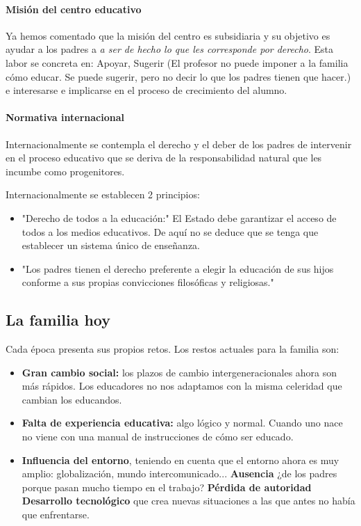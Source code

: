 \documentclass[palatino]{apuntesURJC}
\begin{document}
\paragraph{Misión del centro educativo}

Ya hemos comentado que la misión del centro es subsidiaria y su objetivo es ayudar a los padres a \textit{a ser de hecho lo que les corresponde por derecho}. Esta labor se concreta en: Apoyar, Sugerir (El profesor no puede imponer a la familia cómo educar. Se puede sugerir, pero no decir lo que los padres tienen que hacer.) e interesarse e implicarse en el proceso de crecimiento del alumno.

\paragraph{Normativa internacional}
Internacionalmente se contempla el derecho y el deber de los padres de intervenir en el proceso educativo que se deriva de la responsabilidad natural que les incumbe como progenitores.

Internacionalmente se establecen 2 principios:

\begin{itemize}
	\item "Derecho de todos a la educación:" El Estado debe garantizar el acceso de todos a los medios educativos. 
	De aquí no se deduce que se tenga que establecer un sistema único de enseñanza.
	\item "Los padres tienen el derecho preferente a elegir la educación de sus hijos conforme a sus propias convicciones filosóficas y religiosas."
\end{itemize}

\subsection{La familia hoy}

Cada época presenta sus propios retos. 
%
Los restos actuales para la familia son:

\begin{itemize}
	\item \textbf{Gran cambio social:} los plazos de cambio intergeneracionales ahora son más rápidos. 
	Los educadores no nos adaptamos con la misma celeridad que cambian los educandos.
	\item \textbf{Falta de experiencia educativa: } algo lógico y normal. 
	Cuando uno nace no viene con una manual de instrucciones de cómo ser educado.
	
	\item \textbf{Influencia del entorno}, teniendo en cuenta que el entorno ahora es muy amplio: globalización, mundo intercomunicado... 
	\subitem \textbf{Ausencia} ¿de los padres porque pasan mucho tiempo en el trabajo?
	\subitem \textbf{Pérdida de autoridad}
	\subitem \textbf{Desarrollo tecnológico} que crea nuevas situaciones a las que antes no había que enfrentarse.
\end{itemize}
\end{document}
